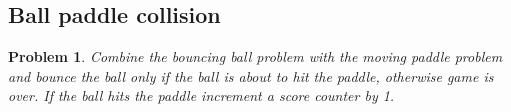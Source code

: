 \documentclass{article}
\newtheorem{prob}{Problem}
\begin{document}
\subsection{Ball paddle collision}

\begin{prob}
  Combine the bouncing ball problem with the moving paddle problem and bounce
  the ball only if the ball is about to hit the paddle, otherwise game is over.
  If the ball hits the paddle increment a score counter by 1.
\end{prob}
\end{document}
